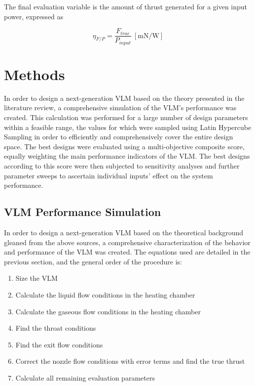 \documentclass{homework}
\begin{document}
\begin{multicols}{2}
		  The final evaluation variable is the amount of thrust generated for a given input power, expressed as  
		    
$$\eta_{F/P} = \frac{F_{true}}{P_{input}} \ [\text{mN/W}]$$ 

\section{Methods}

In order to design a next-generation VLM based on the theory presented in the literature review, a comprehensive simulation of the VLM's performance was created. This calculation was performed for a large number of design parameters within a feasible range, the values for which were sampled using Latin Hypercube Sampling in order to efficiently and comprehensively cover the entire design space. The best designs were evaluated using a multi-objective composite score, equally weighting the main performance indicators of the VLM. The best designs according to this score were then subjected to sensitivity analyses and further parameter sweeps to ascertain individual inputs' effect on the system performance.

\subsection{VLM Performance Simulation}
  In order to design a next-generation VLM based on the theoretical background gleaned from the above sources, a comprehensive characterization of the behavior and performance of the VLM was created. The equations used are detailed in the previous section, and the general order of the procedure is:  
  
\begin{enumerate}
\item Size the VLM
  \item Calculate the liquid flow conditions in the heating chamber
  \item Calculate the gaseous flow conditions in the heating chamber
  \item Find the throat conditions
  \item Find the exit flow conditions
  \item Correct the nozzle flow conditions with error terms and find the true thrust
  \item Calculate all remaining evaluation parameters
  
\end{enumerate}
  

\end{multicols}
\end{document}
